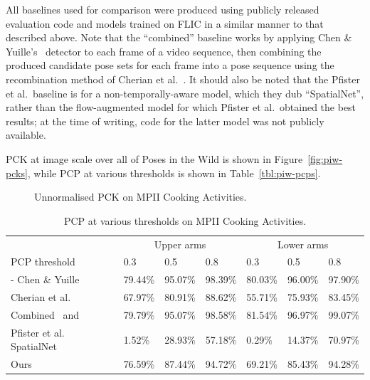 \documentclass[runningheads]{llncs}
\begin{document}
All baselines used for comparison were produced using publicly released
evaluation code and models trained on FLIC in a similar manner to that described
above. Note that the ``combined'' baseline works by applying Chen \&
Yuille's~\cite{chen2014articulated} detector to each frame of a video sequence,
then combining the produced candidate pose sets for each frame into a pose
sequence using the recombination method of Cherian et
al.~\cite{cherian2014mixing}. It should also be noted that the Pfister et al.\
baseline is for a non-temporally-aware model, which they dub ``SpatialNet'',
rather than the flow-augmented model for which Pfister et al.\ obtained the best
results; at the time of writing, code for the latter model was not publicly
available.

PCK at image scale over all of Poses in the Wild is shown in
Figure~\ref{fig:piw-pcks}, while PCP at various thresholds is shown in
Table~\ref{tbl:piw-pcps}.

\begin{figure}[b]
\begin{center}

\end{center}
\vspace{-8mm}
\caption{Unnormalised PCK on MPII Cooking Activities.}
\label{fig:mpii-pcks}
\end{figure}

\begin{table}
{\footnotesize\tabulinesep=1mm
\begin{tabu} to \textwidth {X[2l] || X[c]X[c]X[c] | X[c]X[c]X[c]}
& \multicolumn{3}{c|}{Upper arms} & \multicolumn{3}{c}{Lower arms}\\
PCP threshold & 0.3 & 0.5 & 0.8 & 0.3 & 0.5 & 0.8\\
\tabucline-
Chen \& Yuille~\cite{chen2014articulated} &
79.44\% & 95.07\% & 98.39\% & 80.03\% & 96.00\% & 97.90\%\\
Cherian et al.~\cite{cherian2014mixing} &
67.97\% & 80.91\% & 88.62\% & 55.71\% & 75.93\% & 83.45\%\\
Combined~\cite{cherian2014mixing} and~\cite{chen2014articulated} &
79.79\% & 95.07\% & 98.58\% & 81.54\% & 96.97\% & 99.07\%\\
Pfister et al. SpatialNet~\cite{pfister2015flowing} &
1.52\% & 28.93\% & 57.18\% & 0.29\% & 14.37\% & 70.97\%\\
Ours &
76.59\% & 87.44\% & 94.72\% & 69.21\% & 85.43\% & 94.28\%\\
\end{tabu}}\\
\caption{PCP at various thresholds on MPII Cooking Activities.}
\label{tbl:mpii-pcps}
\end{table}
\end{document}
